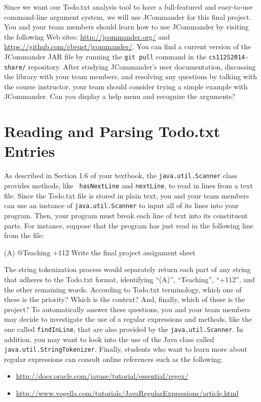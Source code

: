 Since we want our Todo.txt analysis tool to have a full-featured and easy-to-use command-line argument system, we will
use JCommander for this final project.  You and your team members should learn how to use JCommander by visiting the
following Web sites: \url{http://jcommander.org/} and \url{https://github.com/cbeust/jcommander/}. You can find a
current version of the JCommander JAR file by running the {\tt git pull} command in the {\tt cs112S2014-share/}
repository.  After studying JCommander's user documentation, discussing the library with your team members, and
resolving any questions by talking with the course instructor, your team should consider trying a simple example with
JCommander. Can you display a help menu and recognize the arguments?

\section*{Reading and Parsing Todo.txt Entries}

  As described in Section 1.6 of your textbook, the {\tt java.util.Scanner} class provides methods, like {\tt
  hasNextLine} and {\tt nextLine}, to read in lines from a text file.  Since the Todo.txt file is stored in plain text,
  you and your team members can use an instance of {\tt java.util.Scanner} to input all of its lines into your program.
  Then, your program must break each line of text into its constituent parts.  For instance, suppose that the program
  has just read in the following line from the file:

  (A) @Teaching +112 Write the final project assignment sheet

  The string tokenization process would separately return each part of any string that adheres to the Todo.txt format,
  identifying ``(A)'', ``Teaching'', ``+112'', and the other remaining words. According to Todo.txt terminology, which
  one of these is the priority?  Which is the context?  And, finally, which of these is the project?  To automatically
  answer these questions, you and your team members may decide to investigate the use of a regular expressions and
  methods, like the one called {\tt findInLine}, that are also provided by the {\tt java.util.Scanner}. In addition, you
  may want to look into the use of the Java class called {\tt java.util.StringTokenizer}. Finally, students who want to
  learn more about regular expressions can consult online references such as the following:

  \vspace*{-.25in}
  \begin{itemize}
    \itemsep0in
    \item \url{http://docs.oracle.com/javase/tutorial/essential/regex/}
    \item \url{http://www.vogella.com/tutorials/JavaRegularExpressions/article.html}
  \end{itemize}

